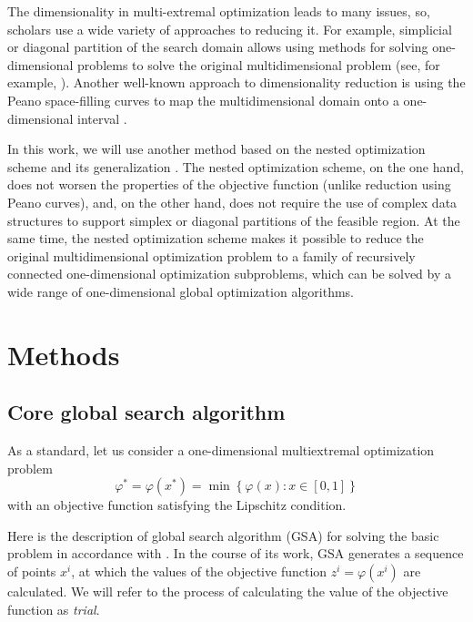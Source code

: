 \documentclass[entropy,article,submit,moreauthors,pdftex]{Definitions/mdpi}
\begin{document}
The dimensionality in multi-extremal optimization leads to many issues, so, scholars use a wide variety of approaches to reducing it.  
For example, simplicial or diagonal partition of the search domain allows using methods for solving one-dimensional problems to solve the original multidimensional problem (see, for example,  \cite{PaulaviciusZilinskas2014,Sergeyev2017}). 
Another well-known approach to dimensionality reduction is using the Peano space-filling curves to map the multidimensional domain onto a one-dimensional interval \cite{Strongin2000,Sergeyev2013}.

In this work, we will use another method based on the nested optimization scheme \cite{Shi2000,Grishagin2001,VanDam2010,Grishagin2015} and its generalization \cite{Grishagin2016,Grishagin2016_1}.
The nested optimization scheme, on the one hand, does not worsen the properties of the objective function (unlike reduction using Peano curves), and, on the other hand, does not require the use of complex data structures to support simplex or diagonal partitions of the feasible region.
At the same time, the nested optimization scheme makes it possible to reduce the original multidimensional optimization problem to a family of recursively connected one-dimensional optimization subproblems, which can be solved by a wide range of one-dimensional global optimization algorithms.


\section{Methods}

\subsection{Core global search algorithm}\label{CoreGSA}

As a standard, let us consider a one-dimensional multiextremal optimization problem
\begin{equation}\label{uni_problem}
\varphi^\ast = \varphi(x^\ast)=\min{\left\{\varphi(x):x\in \left[0,1\right] 
\right\}}
\end{equation}
with an objective function satisfying the Lipschitz condition. 

Here is the description of global search algorithm (GSA) for solving the basic problem in accordance with \cite{Strongin2000}.
In the course of its work, GSA generates a sequence of points  $x^i$, at which the values of the objective function  $z^i=\varphi(x^i)$ are calculated. 
We will refer to the process of calculating the value of the objective function as \textit{trial}.
\end{document}
